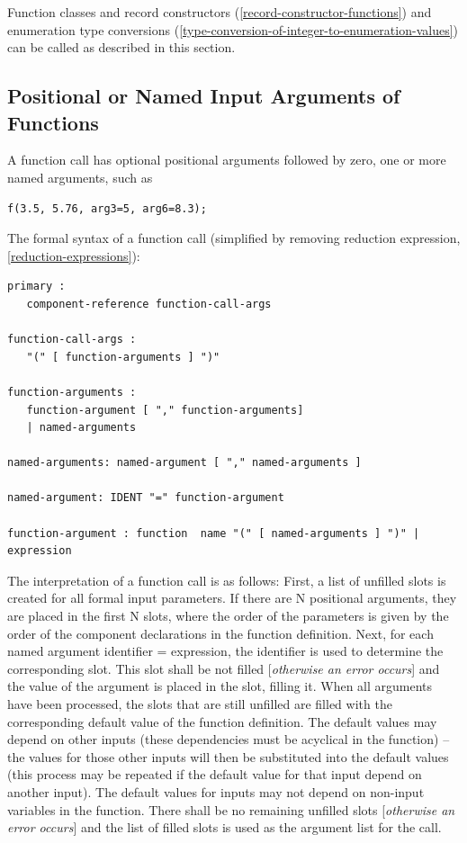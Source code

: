 \documentclass[10pt,a4paper]{report}
\def\doublelabel#1{\label{#1}\hypertarget{#1}{}}
\begin{document}
Function classes and record constructors (\ref{record-constructor-functions}) and enumeration type
conversions (\ref{type-conversion-of-integer-to-enumeration-values}) can be called as described in this section.

\subsection{Positional or Named Input Arguments of Functions}\doublelabel{positional-or-named-input-arguments-of-functions}

A function call has optional positional arguments followed by zero, one
or more named arguments, such as

\begin{lstlisting}[language=modelica]
f(3.5, 5.76, arg3=5, arg6=8.3);
\end{lstlisting}

The formal syntax of a function call (simplified by removing reduction
expression, \ref{reduction-expressions}):
\begin{lstlisting}[language=grammar]
primary :
   component-reference function-call-args

function-call-args :
   "(" [ function-arguments ] ")"

function-arguments :
   function-argument [ "," function-arguments]
   | named-arguments

named-arguments: named-argument [ "," named-arguments ]

named-argument: IDENT "=" function-argument

function-argument : function  name "(" [ named-arguments ] ")" | expression
\end{lstlisting}


The interpretation of a function call is as follows: First, a list of
unfilled slots is created for all formal input parameters. If there are
N positional arguments, they are placed in the first N slots, where the
order of the parameters is given by the order of the component
declarations in the function definition. Next, for each named argument
identifier = expression, the identifier is used to determine the
corresponding slot. This slot shall be not filled {[}\emph{otherwise an
error occurs}{]} and the value of the argument is placed in the slot,
filling it. When all arguments have been processed, the slots that are
still unfilled are filled with the corresponding default value of the
function definition. The default values may depend on other inputs
(these dependencies must be acyclical in the function) -- the values for
those other inputs will then be substituted into the default values
(this process may be repeated if the default value for that input depend
on another input). The default values for inputs may not depend on
non-input variables in the function. There shall be no remaining
unfilled slots {[}\emph{otherwise an error occurs}{]} and the list of
filled slots is used as the argument list for the call.
\end{document}
